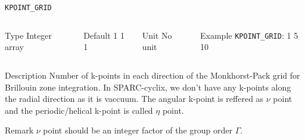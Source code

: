 \begin{frame}[allowframebreaks]{\texttt{KPOINT\_GRID}} \label{KPOINT_GRID}
\vspace*{-12pt}
\begin{columns}
\begin{block}{Type}
Integer array
\end{block}

\begin{block}{Default}
 1 1 1
\end{block}

\begin{block}{Unit}
No unit
\end{block}

\begin{block}{Example}
\texttt{KPOINT\_GRID}: 1 5 10
\end{block}
\end{columns}

\begin{block}{Description}
Number of k-points in each direction of the Monkhorst-Pack grid for Brillouin zone integration. In SPARC-cyclix, we don't have any k-points along the radial direction as it is vaccuum. The angular k-point is reffered as $\nu$ point and the periodic/helical k-point is called $\eta$ point.
\end{block}

\begin{block}{Remark}
$\nu$ point should be an integer factor of the group order $\Gamma$.
\end{block}

\end{frame}



